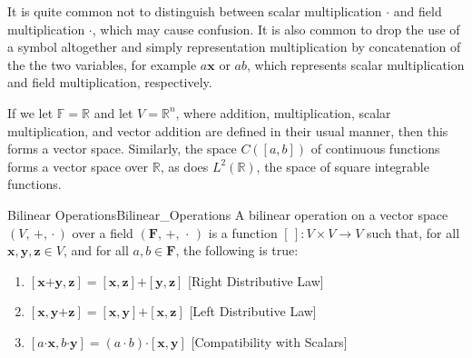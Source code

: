\documentclass[crop=false,class=article]{standalone}                           %
\begin{document}
        It is quite common not to distinguish between scalar multiplication
        $\boldsymbol{\cdot}$ and field multiplication $\cdot$, which may cause
        confusion. It is also common to drop the use of a symbol altogether and
        simply representation multiplication by concatenation of the the
        two variables, for example $a\mathbf{x}$ or $ab$, which represents
        scalar multiplication and field multiplication, respectively.
        \begin{lexample}{}{}
            If we let $\mathbb{F}=\mathbb{R}$ and let
            $V=\mathbb{R}^{n}$, where addition, multiplication, scalar
            multiplication, and vector addition are defined in their usual
            manner, then this forms a vector space. Similarly, the space
            $C([a,b])$ of continuous functions forms a vector space over
            $\mathbb{R}$, as does $L^{2}(\mathbb{R})$, the space of
            square integrable functions.
        \end{lexample}
        \begin{fdefinition}{Bilinear Operations}{Bilinear_Operations}
            A bilinear operation on a vector space
            $(V,\,\boldsymbol{+},\,\boldsymbol{\cdot}\,)$ over a field
            $(\mathbf{F},\,+,\,\cdot\,)$ is a function
            $[\,]:V\times{V}\rightarrow{V}$ such that, for all
            $\mathbf{x},\mathbf{y},\mathbf{z}\in{V}$, and for all
            $a,b\in\mathbf{F}$, the following is true:
            \begin{enumerate}
                \item $[\mathbf{x}\boldsymbol{+}\mathbf{y}, \mathbf{z}]=%
                       [\mathbf{x},\mathbf{z}]\boldsymbol{+}%
                       [\mathbf{y},\mathbf{z}]$
                      \hfill[Right Distributive Law]
                \item $[\mathbf{x},\mathbf{y}\boldsymbol{+}\mathbf{z}]=%
                       [\mathbf{x},\mathbf{y}]\boldsymbol{+}%
                       [\mathbf{x},\mathbf{z}]$
                      \hfill[Left Distributive Law]
                \item $[a\boldsymbol{\cdot}\mathbf{x},%
                        b\boldsymbol{\cdot}\mathbf{y}]=%
                       (a\cdot{b})\boldsymbol{\cdot}[\mathbf{x},\mathbf{y}]$
                      \hfill[Compatibility with Scalars]
            \end{enumerate}
        \end{fdefinition}
\end{document}
